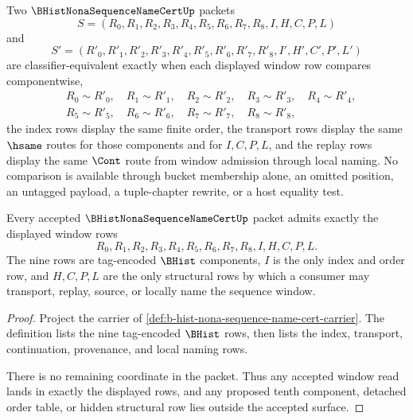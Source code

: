 \begin{definition}
\label{def:b-hist-nona-sequence-name-cert-classifier}
Two $\BHistNonaSequenceNameCertUp$ packets
$$
S=(R_0,R_1,R_2,R_3,R_4,R_5,R_6,R_7,R_8,I,H,C,P,L)
$$
and
$$
S'=(R'_0,R'_1,R'_2,R'_3,R'_4,R'_5,R'_6,R'_7,R'_8,I',H',C',P',L')
$$
are classifier-equivalent exactly when each displayed window row compares componentwise,
$$
\begin{aligned}
&R_0 \sim R'_0,\quad R_1 \sim R'_1,\quad R_2 \sim R'_2,\quad R_3 \sim R'_3,\quad R_4 \sim R'_4,\\
&R_5 \sim R'_5,\quad R_6 \sim R'_6,\quad R_7 \sim R'_7,\quad R_8 \sim R'_8,
\end{aligned}
$$
the index rows display the same finite order, the transport rows display the same $\hsame$ routes for those components and for $I,C,P,L$, and the replay rows display the same $\Cont$ route from window admission through local naming. No comparison is available through bucket membership alone, an omitted position, an untagged payload, a tuple-chapter rewrite, or a host equality test.
\end{definition}

\begin{theorem}
\label{thm:b-hist-nona-sequence-name-cert-window-admission}
Every accepted $\BHistNonaSequenceNameCertUp$ packet admits exactly the displayed window rows
$$
R_0,R_1,R_2,R_3,R_4,R_5,R_6,R_7,R_8,I,H,C,P,L.
$$
The nine rows are tag-encoded $\BHist$ components, $I$ is the only index and order row, and $H,C,P,L$ are the only structural rows by which a consumer may transport, replay, source, or locally name the sequence window.
\end{theorem}
\begin{proof}
Project the carrier of \autoref{def:b-hist-nona-sequence-name-cert-carrier}. The definition lists the nine tag-encoded $\BHist$ rows, then lists the index, transport, continuation, provenance, and local naming rows.

There is no remaining coordinate in the packet. Thus any accepted window read lands in exactly the displayed rows, and any proposed tenth component, detached order table, or hidden structural row lies outside the accepted surface.
\end{proof}

